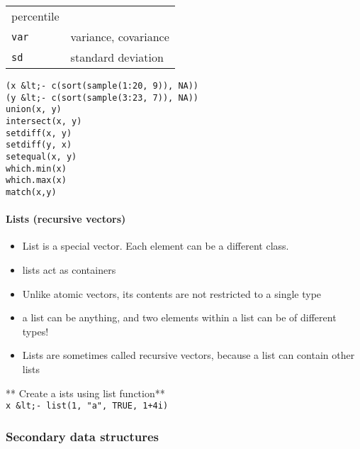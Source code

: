 \documentclass[11pt]{article}
\providecommand{\tightlist}{%
      \setlength{\itemsep}{0pt}\setlength{\parskip}{0pt}}
\begin{document}
\begin{longtable}[c]{@{}ll@{}}
\begin{minipage}[t]{0.81\columnwidth}
percentile
\strut\end{minipage}\tabularnewline
\begin{minipage}[t]{0.13\columnwidth}\raggedright\strut
\texttt{var}
\strut\end{minipage} &
\begin{minipage}[t]{0.81\columnwidth}\raggedright\strut
variance, covariance
\strut\end{minipage}\tabularnewline
\begin{minipage}[t]{0.13\columnwidth}\raggedright\strut
\texttt{sd}
\strut\end{minipage} &
\begin{minipage}[t]{0.81\columnwidth}\raggedright\strut
standard deviation
\strut\end{minipage}\tabularnewline
\bottomrule
\end{longtable}

    \begin{verbatim}
(x &lt;- c(sort(sample(1:20, 9)), NA))
(y &lt;- c(sort(sample(3:23, 7)), NA))
union(x, y)
intersect(x, y)
setdiff(x, y)
setdiff(y, x)
setequal(x, y)
which.min(x)
which.max(x)
match(x,y)
\end{verbatim}

    \paragraph{Lists (recursive vectors)}\label{lists-recursive-vectors}

    \begin{itemize}
\tightlist
\item
  List is a special vector. Each element can be a different class.
\item
  lists act as containers
\item
  Unlike atomic vectors, its contents are not restricted to a single
  type
\item
  a list can be anything, and two elements within a list can be of
  different types!
\item
  Lists are sometimes called recursive vectors, because a list can
  contain other lists
\end{itemize}

    ** Create a ists using list function**\\
\texttt{x\ \&lt;-\ list(1,\ "a",\ TRUE,\ 1+4i)}

    \subsubsection{Secondary data
structures}\label{secondary-data-structures}
\end{document}
